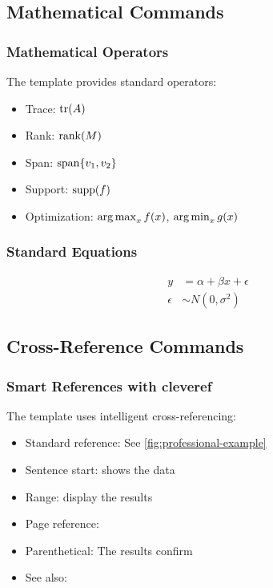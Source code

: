 \subsection{Mathematical Commands}

\subsubsection{Mathematical Operators}

The template provides standard operators:

\begin{itemize}
\item Trace: $\operatorname{tr}(A)$
\item Rank: $\operatorname{rank}(M)$
\item Span: $\operatorname{span}\{v_1, v_2\}$
\item Support: $\operatorname{supp}(f)$
\item Optimization: $\operatorname*{arg\,max}_{x} f(x)$, $\operatorname*{arg\,min}_{x} g(x)$
\end{itemize}

\subsubsection{Standard Equations}

\begin{align}
  y &= \alpha + \beta x + \epsilon \\
  \epsilon &\sim N(0, \sigma^2)
\end{align}

\subsection{Cross-Reference Commands}

\subsubsection{Smart References with cleveref}

The template uses intelligent cross-referencing:

\begin{itemize}
\item Standard reference: See \cref{fig:professional-example}
\item Sentence start:  shows the data
\item Range:  display the results
\item Page reference: 
\item Parenthetical: The results  confirm
\item See also: 
\end{itemize}

